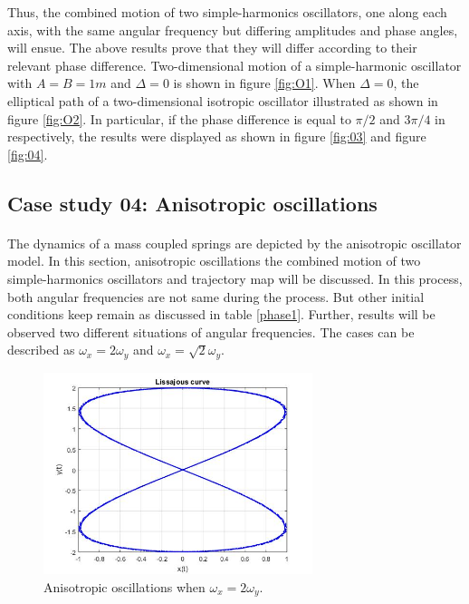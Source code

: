 \newpage

Thus, the combined motion of two simple-harmonics oscillators, one along each axis, with the same angular frequency but differing amplitudes and phase angles, will ensue. The above results prove that they will differ according to their relevant phase difference. Two-dimensional motion of a simple-harmonic oscillator with $A=B=1 m$ and $\Delta= 0$ is shown in figure \ref{fig:O1}. When $\Delta = 0$, the elliptical path of a two-dimensional isotropic oscillator illustrated as shown in figure \ref{fig:O2}. In particular, if the phase difference is equal to $\pi/2$ and $3\pi/4$ in respectively, the results were displayed as shown in figure \ref{fig:03} and  figure \ref{fig:04}. 

\subsection{Case study 04: Anisotropic oscillations}
\paragraph{}
The dynamics of a mass coupled springs are depicted by the  anisotropic oscillator model. In this section, anisotropic oscillations the combined motion of two simple-harmonics oscillators and trajectory map  will be discussed. In this process, both angular frequencies are not same during the process. But other initial conditions keep remain as discussed in table \ref{phase1}. Further, results will be observed two different situations of angular frequencies. The cases can be described as $\omega_x = 2\omega_y$ and $\omega_x = \sqrt{2}\omega_y$.  


 \begin{figure}[hbt!]
	\centering
	\begin{framed}
	\includegraphics[width=0.7\textwidth]{Figures/Lissajous curve.jpg}
	\end{framed}
	\caption{ Anisotropic oscillations when $\omega_x = 2\omega_y$. }
	\label{fig:O5}
\end{figure}

